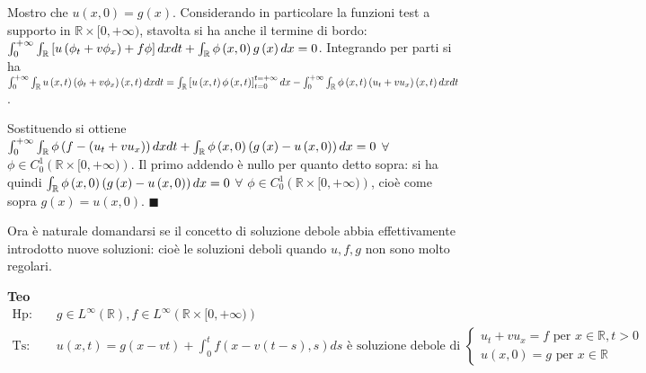 \documentclass{article}
\begin{document}
Mostro che $u\left( x,0\right) =g\left( x\right) $. Considerando in
particolare la funzioni test a supporto in $%
\mathbb{R}
\times \lbrack 0,+\infty )$, stavolta si ha anche il termine di bordo: $%
\int_{0}^{+\infty }\int_{%
\mathbb{R}
}\left[ u\left( \phi _{t}+v\phi _{x}\right) +f\phi \right] dxdt+\int_{%
\mathbb{R}
}\phi \left( x,0\right) g\left( x\right) dx=0$. Integrando per parti si ha $%
\int_{0}^{+\infty }\int_{%
\mathbb{R}
}u\left( x,t\right) \left( \phi _{t}+v\phi _{x}\right) \left( x,t\right)
dxdt=\int_{%
\mathbb{R}
}\left[ u\left( x,t\right) \phi \left( x,t\right) \right] _{t=0}^{t=+\infty
}dx-\int_{0}^{+\infty }\int_{%
\mathbb{R}
}\phi \left( x,t\right) \left( u_{t}+vu_{x}\right) \left( x,t\right) dxdt$.

Sostituendo si ottiene $\int_{0}^{+\infty }\int_{%
\mathbb{R}
}\phi \left( f-\left( u_{t}+vu_{x}\right) \right) dxdt+\int_{%
\mathbb{R}
}\phi \left( x,0\right) \left( g\left( x\right) -u\left( x,0\right) \right)
dx=0$ $\forall $ $\phi \in C_{0}^{1}\left( 
\mathbb{R}
\times \lbrack 0,+\infty )\right) $. Il primo addendo \`{e} nullo per quanto
detto sopra: si ha quindi $\int_{%
\mathbb{R}
}\phi \left( x,0\right) \left( g\left( x\right) -u\left( x,0\right) \right)
dx=0$ $\forall $ $\phi \in C_{0}^{1}\left( 
\mathbb{R}
\times \lbrack 0,+\infty )\right) $, cio\`{e} come sopra $g\left( x\right)
=u\left( x,0\right) $. $\blacksquare $

Ora \`{e} naturale domandarsi se il concetto di soluzione debole abbia
effettivamente introdotto nuove soluzioni: cio\`{e} le soluzioni deboli
quando $u,f,g$ non sono molto regolari.

\textbf{Teo}%
\begin{eqnarray*}
\text{Hp}\text{: } &&g\in L^{\infty }\left( 
\mathbb{R}
\right) ,f\in L^{\infty }\left( 
\mathbb{R}
\times \lbrack 0,+\infty )\right) \text{ } \\
\text{Ts}\text{: } &&u\left( x,t\right) =g\left( x-vt\right)
+\int_{0}^{t}f\left( x-v\left( t-s\right) ,s\right) ds\text{ \`{e} soluzione
debole di }\left\{ 
\begin{array}{c}
u_{t}+vu_{x}=f\text{ per }x\in 
\mathbb{R}
,t>0 \\ 
u\left( x,0\right) =g\text{ per }x\in 
\mathbb{R}%
\end{array}%
\right.
\end{eqnarray*}
\end{document}
